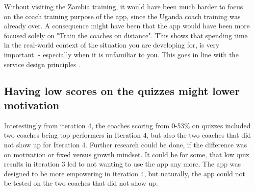   Without visiting the Zambia training, it would have been much harder to focus on the coach training purpose of the app, since the Uganda coach training was already over. A consequence might have been that the app would have been more focused solely on "Train the coaches on distance". This shows that spending time in the real-world context of the situation you are developing for, is very important. - especially when it is unfamiliar to you. This goes in line with the service design principles \citep{stickdorn}.

  \subsection{Having low scores on the quizzes might lower motivation}
  Interestingly from iteration 4, the coaches scoring from 0-53\% on quizzes included two coaches being top performers in Iteration 4, but also the two coaches that did not show up for Iteration 4. Further research could be done, if the difference was on motivation or fixed versus growth mindset. It could be for some, that low quiz results in iteration 3 led to not wanting to use the app any more. The app was designed to be more empowering in iteration 4, but naturally, the app could not be tested on the two coaches that did not show up.

